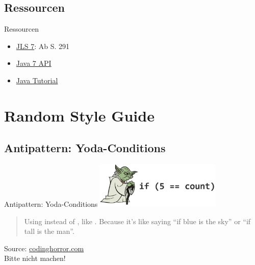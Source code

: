 \documentclass[usepdftitle=false,hyperref={pdfpagelabels=false}]{beamer}
\begin{document}
\subsection{Ressourcen}
\begin{frame}{Ressourcen}
  \begin{itemize}
    \item \href{http://docs.oracle.com/javase/specs/jls/se7/jls7.pdf}{JLS 7}: Ab S. 291
    \item \href{http://docs.oracle.com/javase/7/docs/api/java/util/Arrays.html}{Java 7 API}
    \item \href{http://docs.oracle.com/javase/tutorial/java/nutsandbolts/arrays.html}{Java Tutorial}
  \end{itemize}
\end{frame}

\section{Random Style Guide}
\subsection{Antipattern: Yoda-Conditions}
\begin{frame}{Antipattern: Yoda-Conditions}
    \includegraphics[width=60mm]{yoda-condition.png}\\
    \begin{quote}
        Using  instead of 
        , like . 
        Because it's like saying ``if blue is the sky'' or ``if tall 
        is the man''.
    \end{quote}
    Source: \href{http://www.codinghorror.com/blog/2012/07/new-programming-jargon.html}{codinghorror.com}\\

    Bitte nicht machen!
\end{frame}
\end{document}
